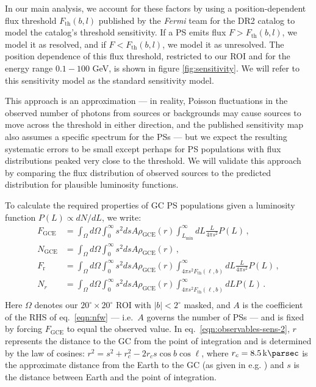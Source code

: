 \documentclass[letter,11pt]{article}
\begin{document}
In our main analysis, we account for these factors by using a position-dependent flux threshold $F_\text{th}(b, l)$ published by the \textit{Fermi} team for the DR2 catalog \cite{Fermi-LAT:2019yla, Ballet:2020hze} to model the catalog's threshold sensitivity. If a PS emits flux $F > F_\text{th}(b, l)$, we model it as resolved, and if $F < F_\text{th}(b, l)$, we model it as unresolved. The position dependence of this flux threshold, restricted to our ROI and for the energy range $0.1-100$ GeV, is shown in figure \ref{fig:sensitivity}. We will refer to this sensitivity model as the standard sensitivity model.

This approach is an approximation --- in reality, Poisson fluctuations in the observed number of photons from sources or backgrounds may cause sources to move across the threshold in either direction, and the published sensitivity map also assumes a specific spectrum for the PSs --- but we expect the resulting systematic errors to be small except perhaps for PS populations with flux distributions peaked very close to the threshold. We will validate this approach by comparing the flux distribution of observed sources to the predicted distribution for plausible luminosity functions.

To calculate the required properties of GC PS populations given a luminosity function $P(L) \propto dN/dL$, we write:
\begin{equation}
    \begin{split}
        F_\text{GCE} &= \int_\Omega d\Omega \int_0^\infty s^2 ds A \rho_\text{GCE}(r)\int_{L_\text{min}}^\infty dL \frac{L}{4\pi s^2}P(L)\,, \\
        N_\text{GCE} &= \int_\Omega d\Omega \int_0^\infty s^2 ds A \rho_\text{GCE}(r)\,, \\
        F_\text{r} &= \int_\Omega d\Omega \int_0^\infty s^2 ds A \rho_\text{GCE}(r)\int_{4\pi s^2F_\text{th}(\ell, b)}^\infty dL \frac{L}{4\pi s^2}P(L)\,, \\
        N_r &= \int_\Omega d\Omega \int_0^\infty s^2 ds A \rho_\text{GCE}(r)\int_{4\pi s^2F_\text{th}(\ell, b)}^\infty dL P(L) \,. \\
        \label{eqn:observables-sens-2}
    \end{split}
\end{equation}
Here $\Omega$ denotes our $20^\circ \times 20^\circ$ ROI with $|b| < 2^\circ$ masked, and $A$ is the coefficient of the RHS of eq.~\ref{eqn:nfw} --- i.e.~$A$ governs the number of PSs --- and is fixed by forcing $F_\text{GCE}$ to equal the observed value. In eq.~\ref{eqn:observables-sens-2}, $r$ represents the distance to the GC from the point of integration and is determined by the law of cosines: $r^2 = s^2 + r_c^2 - 2r_c s \cos b \cos \ell$, where $r_c=\SI{8.5}{\kilo\parsec}$ is the approximate distance from the Earth to the GC (as given in e.g. \cite{Bartels:2015aea}) and $s$ is the distance between Earth and the point of integration.
\end{document}
